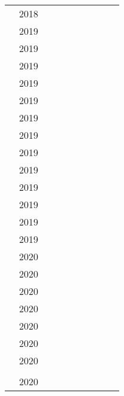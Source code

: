 \begin{table}
\begin{tabularx}{\textwidth}{@{}Xp{1cm}XXXXXXXX@{}}
    \citeauthor{mcdermott2018semi}& 2018& & & & & & & \\
    
    \citeauthor{Wang_2019}& 2019& & & & & & & \\
    
    \citeauthor{Fisher2019}&2019 & & & & & & & \\
    
    \citeauthor{cui2019conan}&2019 & & & & & & & \\

    
    \citeauthor{Xu2019-ay}& 2019& & & & & & & \\

    
    \citeauthor{Beaulieu-Jones2019-ct}&2019 & & & & & & & \\
    
    \citeauthor{severo2019ward2icu}&2019 & & & & & & & \\
    
    \citeauthor{Jackson_2019}& 2019& & & & & & & \\
    
    \citeauthor{Yang_2019}& 2019& & & & & & & \\
    
    
    \citeauthor{chu2019treatment}&2019 & & & & & & & \\
    
    \citeauthor{Chen_2019}& 2019& & & & & & & \\
    
    \citeauthor{Baowaly_2019}& 2019& & & & & & & \\
    
    \citeauthor{Baowaly2019}& 2019& & & & & & & \\
    
    \citeauthor{torfi2019generating}& 2019& & & & & & & \\
    
    \citeauthor{Zhang2020-wp}& 2020& & & & & & & \\
    
    \citeauthor{Goncalves2020}&2020 & & & & & & & \\
    
    \citeauthor{Yale_2020}& 2020& & & & & & & \\
    
    \citeauthor{BaeAnomiGAN2020}& 2020& & & & & & & \\
    
    \citeauthor{Yoon2020}& 2020& & & & & & & \\
    
    \citeauthor{Li_2020}& 2020& & & & & & & \\
        
    \citeauthor{walsh2020generating}& 2020 & & & & & & & \\
    
    \citeauthor{yale:hal-02160496}& & & & & & & & \\
    
    \citeauthor{chincheong2020generation}& 2020 & & & & & & & \\
    
    \bottomrule
    \end{tabularx}
\end{table}